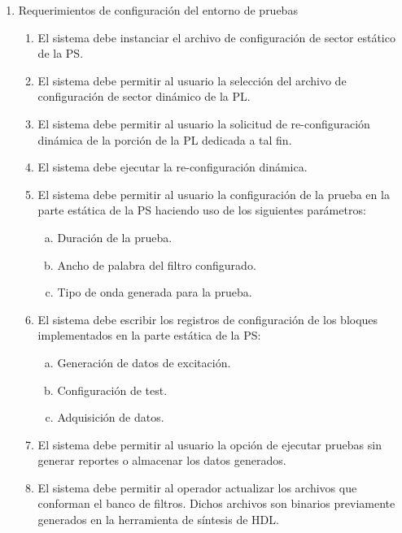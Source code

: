 \documentclass[
11pt, %
]{charter}
\begin{document}
\begin{enumerate}
	\item Requerimientos de configuración del entorno de pruebas
	\begin{enumerate}
		\item El sistema debe instanciar el archivo de configuración de sector estático de la PS.
		\item El sistema debe permitir al usuario la selección del archivo de configuración de sector dinámico de la PL.
		\item El sistema debe permitir al usuario la solicitud de re-configuración dinámica de la porción de la PL dedicada a tal fin.
		\item El sistema debe ejecutar la re-configuración dinámica.
		\item El sistema debe permitir al usuario la configuración de la prueba en la parte estática de la PS haciendo uso de los siguientes parámetros:
		\begin{enumerate}[a.]
			\item Duración de la prueba.
			\item Ancho de palabra del filtro configurado.
			\item Tipo de onda generada para la prueba.
		\end{enumerate}
		\item El sistema debe escribir los registros de configuración de los bloques implementados en la parte estática de la PS:
		 \begin{enumerate}[a.]
			\item Generación de datos de excitación.
			\item Configuración de test.
			\item Adquisición de datos.
		\end{enumerate}
		\item El sistema debe permitir al usuario la opción de ejecutar pruebas sin generar reportes o almacenar los datos generados. 
		\item El sistema debe permitir al operador actualizar los archivos que conforman el banco de filtros. Dichos archivos son binarios previamente generados en la herramienta de síntesis de HDL.	
	\end{enumerate}
		

\end{enumerate}
\end{document}
